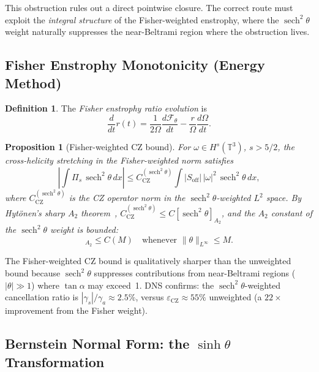 \documentclass[12pt,a4paper]{article}
\newtheorem{proposition}[theorem]{Proposition}
\theoremstyle{definition}
\newtheorem{definition}[theorem]{Definition}
\newcommand{\sech}{\operatorname{sech}}
\newcommand{\T}{\mathbb{T}}
\newcommand{\F}{\mathcal{F}}
\begin{document}
This obstruction rules out a direct pointwise closure.
The correct route must exploit the \emph{integral structure} of the
Fisher-weighted enstrophy, where the $\sech^2\theta$ weight
naturally suppresses the near-Beltrami region where the obstruction lives.

\subsection{Fisher Enstrophy Monotonicity (Energy Method)}

\begin{definition}
The \emph{Fisher enstrophy ratio evolution} is
\begin{equation}
\frac{d}{dt}r(t) = \frac{1}{2\Omega}\frac{d\F_\theta}{dt}
  - \frac{r}{\Omega}\frac{d\Omega}{dt}.
\end{equation}
\end{definition}

\begin{proposition}[Fisher-weighted CZ bound]\label{prop:fisher_cz}
For $\omega\in H^s(\T^3)$, $s>5/2$, the cross-helicity stretching
in the Fisher-weighted norm satisfies
\begin{equation}\label{eq:fisher_cz}
\left|\int \Pi_s\,\sech^2\theta\,dx\right|
\le C_{\mathrm{CZ}}^{(\sech^2\theta)}
\int |S_{\mathrm{off}}|\,|\omega|^2\,\sech^2\theta\,dx,
\end{equation}
where $C_{\mathrm{CZ}}^{(\sech^2\theta)}$ is the CZ operator norm
in the $\sech^2\theta$-weighted $L^2$ space.
By Hyt\"onen's sharp $A_2$ theorem~\cite{Hyt12},
$C_{\mathrm{CZ}}^{(\sech^2\theta)}\le C[\sech^2\theta]_{A_2}$,
and the $A_2$ constant of the $\sech^2\theta$ weight is bounded:
\begin{equation}
[\sech^2\theta]_{A_2}\le C(M)\quad\text{whenever }\|\theta\|_{L^\infty}\le M.
\end{equation}
\end{proposition}

The Fisher-weighted CZ bound is qualitatively sharper than the
unweighted bound because $\sech^2\theta$ suppresses contributions from
near-Beltrami regions ($|\theta|\gg 1$) where $\tan\alpha$ may exceed~1.
DNS confirms: the $\sech^2\theta$-weighted cancellation ratio is
$|\gamma_s|/\gamma_a\approx 2.5\%$, versus $\varepsilon_{\mathrm{CZ}}\approx 55\%$
unweighted (a $22\times$ improvement from the Fisher weight).

\subsection{Bernstein Normal Form: the $\sinh\theta$ Transformation}
\end{document}
